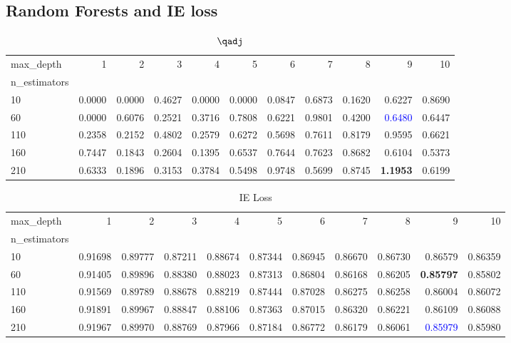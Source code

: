 
\newpage
\subsection*{Random Forests and IE loss}

\begin{table}[H]
    \centering
    \begin{tabular}{lrrrrrrrrrr}
    \toprule
    max\_depth &      1  &      2  &      3  &      4  &      5  &      6  &      7  &      8  &      9  &      10 \\
    n\_estimators &         &         &         &         &         &         &         &         &         &         \\
    \midrule
    10           &  0.0000 &  0.0000 &  0.4627 &  0.0000 &  0.0000 &  0.0847 &  0.6873 &  0.1620 &  0.6227 &  0.8690 \\
    60           &  0.0000 &  0.6076 &  0.2521 &  0.3716 &  0.7808 &  0.6221 &  0.9801 &  0.4200 &  \textcolor{blue}{0.6480} &  0.6447 \\
    110          &  0.2358 &  0.2152 &  0.4802 &  0.2579 &  0.6272 &  0.5698 &  0.7611 &  0.8179 &  0.9595 &  0.6621 \\
    160          &  0.7447 &  0.1843 &  0.2604 &  0.1395 &  0.6537 &  0.7644 &  0.7623 &  0.8682 &  0.6104 &  0.5373 \\
    210          &  0.6333 &  0.1896 &  0.3153 &  0.3784 &  0.5498 &  0.9748 &  0.5699 &  0.8745 &  \bf 1.1953 &  0.6199 \\
    \bottomrule
    \end{tabular}
    \caption{$\qadj$}
    \label{tab:my_label}
\end{table}

\begin{table}[H]
    \centering
    \begin{tabular}{lrrrrrrrrrr}
    \toprule
    max\_depth &       1  &       2  &       3  &       4  &       5  &       6  &       7  &       8  &       9  &       10 \\
    n\_estimators &          &          &          &          &          &          &          &          &          &          \\
    \midrule
    10           &  0.91698 &  0.89777 &  0.87211 &  0.88674 &  0.87344 &  0.86945 &  0.86670 &  0.86730 &  0.86579 &  0.86359 \\
    60           &  0.91405 &  0.89896 &  0.88380 &  0.88023 &  0.87313 &  0.86804 &  0.86168 &  0.86205 &  \bf 0.85797 &  0.85802 \\
    110          &  0.91569 &  0.89789 &  0.88678 &  0.88219 &  0.87444 &  0.87028 &  0.86275 &  0.86258 &  0.86004 &  0.86072 \\
    160          &  0.91891 &  0.89967 &  0.88847 &  0.88106 &  0.87363 &  0.87015 &  0.86320 &  0.86221 &  0.86109 &  0.86088 \\
    210          &  0.91967 &  0.89970 &  0.88769 &  0.87966 &  0.87184 &  0.86772 &  0.86179 &  0.86061 &  \textcolor{blue}{0.85979} &  0.85980 \\
    \bottomrule
    \end{tabular}
    \caption{IE Loss}
    \label{tab:my_label}
\end{table}
